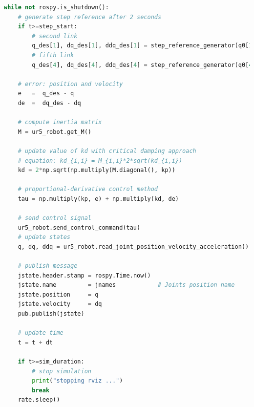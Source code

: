 \begin{lstlisting}[language=Python,caption={Move the second and fifth joint of UR5 robot with the requirement motion of activity 1.5.1}, label={lst:joint_PD_control_critical_damping}]
while not rospy.is_shutdown():
    # generate step reference after 2 seconds
    if t>=step_start:
        # second link
        q_des[1], dq_des[1], ddq_des[1] = step_reference_generator(q0[1], -0.4)
        # fifth link
        q_des[4], dq_des[4], ddq_des[4] = step_reference_generator(q0[4], 0.5)

    # error: position and velocity
    e 	=  q_des - q
    de 	=  dq_des - dq    

    # compute inertia matrix
    M = ur5_robot.get_M()

    # update value of kd with critical damping approach
    # equation: kd_{i,i} = M_{i,i}*2*sqrt(kd_{i,i})
    kd = 2*np.sqrt(np.multiply(M.diagonal(), kp))

    # proportional-derivative control method
    tau = np.multiply(kp, e) + np.multiply(kd, de)
    
    # send control signal
    ur5_robot.send_control_command(tau)
    # update states
    q, dq, ddq = ur5_robot.read_joint_position_velocity_acceleration()

    # publish message
    jstate.header.stamp = rospy.Time.now()
    jstate.name 		= jnames			# Joints position name
    jstate.position 	= q
    jstate.velocity 	= dq
    pub.publish(jstate)

    # update time
    t = t + dt

    if t>=sim_duration:
        # stop simulation
        print("stopping rviz ...")
        break
    rate.sleep()
\end{lstlisting}

